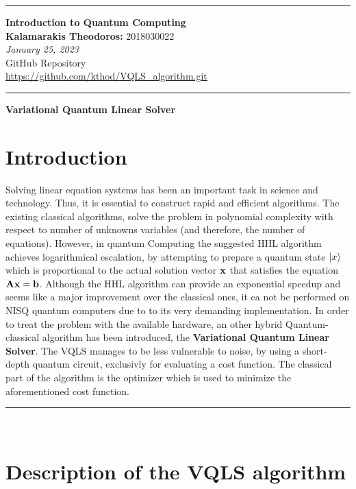 \documentclass[12pt]{article}
\begin{document}
\noindent\rule{\textwidth}{2pt}
\begin{center}
\large
{\bf Introduction to Quantum Computing}\\ 
\normalsize
{\bf Kalamarakis Theodoros:} 2018030022\\
{\it January 25, 2023}\\
{GitHub Repository}\\
{\underline{\url{https://github.com/kthod/VQLS_algorithm.git}}}
\end{center}
\rule{\textwidth}{.5pt}
\noindent


\justifying

   \begin{center}
       \vspace*{0.5cm}
           
       \LARGE
       \textbf{Variational Quantum Linear Solver}
         
   \end{center}

\section*{{\bf Introduction}}
Solving linear equation systems has been an important task in science and technology. Thus, it is essential 
to construct rapid and efficient algorithms. The existing classical algorithms, solve the problem in polynomial
complexity with respect to number of unknowns variables (and therefore, the number of equations). However, in 
quantum Computing the suggested HHL algorithm achieves logarithmical escalation, by attempting to prepare a quantum state
$\left\vert{x}\right\rangle$ which is proportional to the actual solution vector $\bf x$ that satisfies the equation $\bf Ax=b$.
Although the HHL algorithm can provide an exponential speedup and  seems like a major improvement over the classical ones, it ca not be performed on NISQ quantum computers due to 
to its very demanding implementation. In order to treat the problem with the available hardware, an other hybrid Quantum-classical 
algorithm has been introduced, the {\bf Variational Quantum Linear Solver}. The VQLS manages to be less vulnerable to noise, by using a short-depth quantum circuit,
exclusivly for evaluating a cost function. The classical part of the algorithm is the optimizer which is used to minimize the aforementioned cost function.
{\raggedleft
\rule{\textwidth}{.5pt}}\\
\section*{{\bf Description of the VQLS algorithm}}
\end{document}
